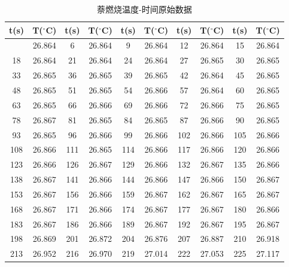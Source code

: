 \documentclass[12pt]{ctexart}
\numberwithin{equation}{section}
\begin{document}
\begin{longtable}{cc|cc|cc|cc|cc}
    \caption{萘燃烧温度-时间原始数据} \\
    \hline
    t(s) & T($^\circ$C) & t(s) & T($^\circ$C) & t(s) & T($^\circ$C) & t(s) & T($^\circ$C) & t(s) & T($^\circ$C) \\
    \hline
    \endhead
    \hline
    \endfoot
    3        & 26.864   & 6        & 26.864   & 9        & 26.864   & 12       & 26.864   & 15       & 26.864   \\
    18       & 26.864   & 21       & 26.864   & 24       & 26.864   & 27       & 26.865   & 30       & 26.865   \\
    33       & 26.865   & 36       & 26.865   & 39       & 26.865   & 42       & 26.864   & 45       & 26.865   \\
    48       & 26.865   & 51       & 26.865   & 54       & 26.866   & 57       & 26.864   & 60       & 26.865   \\
    63       & 26.865   & 66       & 26.866   & 69       & 26.866   & 72       & 26.866   & 75       & 26.865   \\
    78       & 26.867   & 81       & 26.865   & 84       & 26.865   & 87       & 26.866   & 90       & 26.865   \\
    93       & 26.865   & 96       & 26.866   & 99       & 26.866   & 102      & 26.866   & 105      & 26.866   \\
    108      & 26.866   & 111      & 26.865   & 114      & 26.866   & 117      & 26.866   & 120      & 26.866   \\
    123      & 26.866   & 126      & 26.867   & 129      & 26.866   & 132      & 26.867   & 135      & 26.866   \\
    138      & 26.867   & 141      & 26.866   & 144      & 26.866   & 147      & 26.866   & 150      & 26.867   \\
    153      & 26.867   & 156      & 26.866   & 159      & 26.867   & 162      & 26.867   & 165      & 26.867   \\
    168      & 26.867   & 171      & 26.866   & 174      & 26.867   & 177      & 26.867   & 180      & 26.866   \\
    183      & 26.867   & 186      & 26.866   & 189      & 26.867   & 192      & 26.867   & 195      & 26.867   \\
    198      & 26.869   & 201      & 26.872   & 204      & 26.876   & 207      & 26.887   & 210      & 26.918   \\
    213      & 26.952   & 216      & 26.970   & 219      & 27.014   & 222      & 27.053   & 225      & 27.117   \\

\end{longtable}
\end{document}
